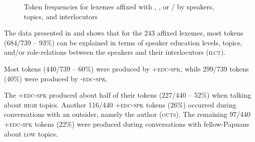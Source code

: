 \begin{figure} 
\caption[Token frequencies for lexemes affixed with {ber-}, , or \textitbf{-}/\textitbf{-} by speakers, topics, and interlocutors]{Token frequencies for lexemes affixed with , , or \textitbf{-}/\textitbf{-} by speakers, topics, and interlocutors}\label{Figure_3.4}
\end{figure}




The data presented in  and  shows that for the 243 affixed lexemes, most tokens (684/739 – 93\%) can be explained in terms of speaker education levels, topics, and/or role-relations between the speakers and their interlocutors (\textsc{ilct}).


Most tokens (440/739 – 60\%) were produced by \textsc{+edc-spk}, while 299/739 tokens (40\%) were produced by \textsc{-edc-spk}.

 
The \textsc{+edc-spk} produced about half of their tokens (227/440 – 52\%) when talking about \textsc{high} topics. Another 116/440 \textsc{+edc-spk} tokens (26\%) occurred during conversations with an outsider, namely the author (\textsc{outs}). The remaining 97/440 \textsc{+edc-spk} tokens (22\%) were produced during conversations with fellow-Papuans about \textsc{low} topics.



